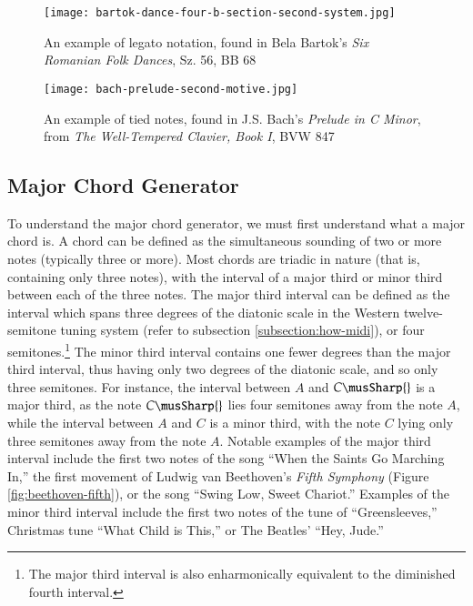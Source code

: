\begin{figure}[h]
  \centering
  \texttt{[image: bartok-dance-four-b-section-second-system.jpg]}
  \caption{An example of legato notation, found in Bela Bartok's \textit{Six Romanian Folk Dances}, Sz. 56, BB 68}
  \label{fig:legato-notes-example}
\end{figure}

\begin{figure}[h]
  \centering
  \texttt{[image: bach-prelude-second-motive.jpg]}
  \caption{An example of tied notes, found in J.S. Bach's \textit{Prelude in C Minor}, from \textit{The Well-Tempered Clavier, Book I}, BVW 847}
  \label{fig:tied-notes-example}
\end{figure}

\subsection{Major Chord Generator}

To understand the major chord generator, we must first understand what a major chord is. A chord can be defined as the simultaneous sounding of two or more notes (typically three or more). Most chords are triadic in nature (that is, containing only three notes), with the interval of a major third or minor third between each of the three notes. The major third interval can be defined as the interval which spans three degrees of the diatonic scale in the Western twelve-semitone tuning system (refer to subsection \ref{subsection:how-midi}), or four semitones.\footnote{The major third interval is also enharmonically equivalent to the diminished fourth interval.} The minor third interval contains one fewer degrees than the major third interval, thus having only two degrees of the diatonic scale, and so only three semitones. For instance, the interval between $A$ and $C\musSharp{}$ is a major third, as the note $C\musSharp{}$ lies four semitones away from the note $A$, while the interval between $A$ and $C$ is a minor third, with the note $C$ lying only three semitones away from the note $A$. Notable examples of the major third interval include the first two notes of the song ``When the Saints Go Marching In,'' the first movement of Ludwig van Beethoven's \textit{Fifth Symphony} (Figure \ref{fig:beethoven-fifth}\cite{Beethoven_1862}), or the song ``Swing Low, Sweet Chariot.'' Examples of the minor third interval include the first two notes of the tune of ``Greensleeves,'' Christmas tune ``What Child is This,'' or The Beatles' ``Hey, Jude.'' %

